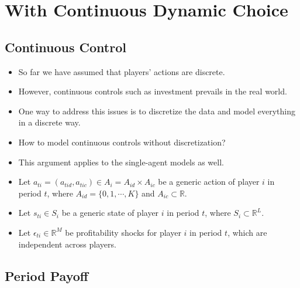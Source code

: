 \documentclass[]{book}
\providecommand{\tightlist}{%
  \setlength{\itemsep}{0pt}\setlength{\parskip}{0pt}}
\begin{document}
\section{With Continuous Dynamic
Choice}\label{with-continuous-dynamic-choice}

\subsection{Continuous Control}\label{continuous-control}

\begin{itemize}
\tightlist
\item
  So far we have assumed that players' actions are discrete.
\item
  However, continuous controls such as investment prevails in the real
  world.
\item
  One way to address this issues is to discretize the data and model
  everything in a discrete way.
\item
  How to model continuous controls without discretization?
\item
  This argument applies to the single-agent models as well.
\item
  Let \(a_{ti} = (a_{tid}, a_{tic}) \in A_i = A_{id} \times A_{ic}\) be
  a generic action of player \(i\) in period \(t\), where
  \(A_{id} = \{0, 1, \cdots, K\}\) and \(A_{ic} \subset \mathbb{R}\).
\item
  Let \(s_{ti} \in S_i\) be a generic state of player \(i\) in period
  \(t\), where \(S_i \subset \mathbb{R}^L\).
\item
  Let \(\epsilon_{ti} \in \mathbb{R}^M\) be profitability shocks for
  player \(i\) in period \(t\), which are independent across players.
\end{itemize}

\subsection{Period Payoff}\label{period-payoff-1}
\end{document}

